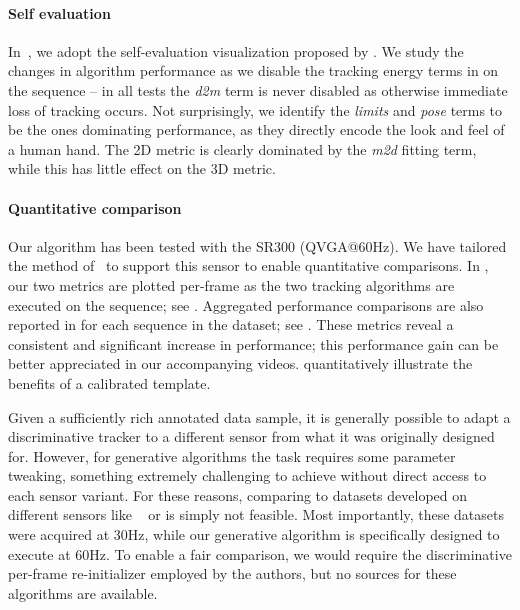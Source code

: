 \paragraph{Self evaluation}
% 
In~, we adopt the self-evaluation visualization proposed by \cite{taylor2016concerto}. We study the changes in algorithm performance as we disable the tracking energy terms in  on the  sequence -- in all tests the \emph{d2m} term is never disabled as otherwise immediate loss of tracking occurs. Not surprisingly, we identify the \emph{limits} and \emph{pose} terms to be the ones dominating performance, as they directly encode the look and feel of a human hand. The 2D metric is clearly dominated by the \emph{m2d} fitting term, while this has little effect on the 3D metric. 
% 



\paragraph{Quantitative comparison}
Our algorithm has been tested with the \realsense{} SR300 (QVGA@60Hz).  We have tailored the method of~\cite{tagliasacchi2015robust} to support this sensor to enable quantitative comparisons. In , our two metrics are plotted per-frame as the two tracking algorithms are executed on the  sequence; see . Aggregated performance comparisons are also reported in  for each sequence in the \handy{} dataset; see . These metrics reveal a consistent and significant increase in performance; this performance gain can be better appreciated in our accompanying videos.  quantitatively illustrate the benefits of a calibrated template.

Given a sufficiently rich annotated data sample, it is generally possible to adapt a discriminative tracker to a different sensor from what it was originally designed for. However, for generative algorithms the task requires some parameter tweaking, something extremely challenging to achieve without direct access to each sensor variant. For these reasons, comparing to datasets developed on different sensors like \dexter{}~\cite{sridhar2013multicam} or \fingerpaint{} \cite{sharp2015accurate} is simply not feasible. Most importantly, these datasets were acquired at 30Hz, while our generative algorithm is specifically designed to execute at 60Hz. To enable a fair comparison, we would require the discriminative per-frame re-initializer employed by the authors, but no sources for these algorithms are available.

